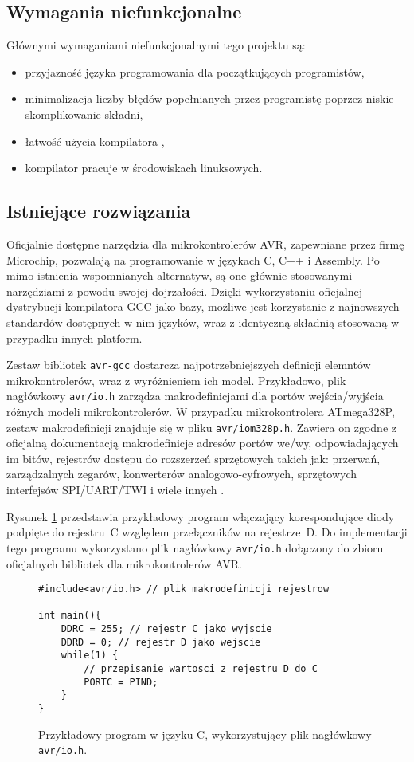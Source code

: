 \subsection{Wymagania niefunkcjonalne}
Głównymi wymaganiami niefunkcjonalnymi tego projektu są:
\begin{itemize}
\item przyjazność języka programowania dla początkujących programistów,
\item minimalizacja liczby błędów popełnianych przez programistę poprzez niskie skomplikowanie składni,
\item łatwość użycia kompilatora ,
\item kompilator pracuje w środowiskach linuksowych.
\end{itemize}

\subsection{Istniejące rozwiązania}
Oficjalnie dostępne narzędzia dla mikrokontrolerów AVR, zapewniane przez firmę Microchip, pozwalają na programowanie w językach C, C++ i Assembly. Po mimo istnienia wspomnianych alternatyw, są one głównie stosowanymi narzędziami z powodu swojej dojrzałości.
Dzięki wykorzystaniu oficjalnej dystrybucji kompilatora GCC jako bazy, możliwe jest korzystanie z najnowszych standardów dostępnych w nim języków, wraz z identyczną składnią stosowaną w przypadku innych platform.

Zestaw bibliotek \lstinline|avr-gcc| dostarcza najpotrzebniejszych definicji elemntów mikrokontrolerów, wraz z wyróżnieniem ich model. Przykładowo, plik nagłówkowy \lstinline|avr/io.h| zarządza makrodefinicjami dla portów wejścia/wyjścia różnych modeli mikrokontrolerów. W przypadku mikrokontrolera ATmega328P, zestaw makrodefinicji znajduje się w pliku \lstinline|avr/iom328p.h|. Zawiera on zgodne z oficjalną dokumentacją makrodefinicje adresów portów we/wy, odpowiadających im bitów, rejestrów dostępu do rozszerzeń sprzętowych takich jak: przerwań, zarządzalnych zegarów, konwerterów analogowo-cyfrowych, sprzętowych interfejsów SPI/UART/TWI i wiele innych \cite{ATmega328P8bitAVR}.

Rysunek \ref{fig:lst:c-example} przedstawia przykładowy program włączający korespondujące diody podpięte do rejestru~C względem przełączników na rejestrze~D. Do implementacji tego programu wykorzystano plik nagłówkowy \lstinline|avr/io.h| dołączony do zbioru oficjalnych bibliotek dla mikrokontrolerów AVR.
\begin{figure}
\centering
\begin{lstlisting}
#include<avr/io.h> // plik makrodefinicji rejestrow

int main(){
	DDRC = 255; // rejestr C jako wyjscie
	DDRD = 0; // rejestr D jako wejscie
	while(1) {
		// przepisanie wartosci z rejestru D do C
		PORTC = PIND;
	}
}
\end{lstlisting}
\caption{Przykładowy program w języku C, wykorzystujący plik nagłówkowy \lstinline|avr/io.h|.}
\label{fig:lst:c-example}
\end{figure}

